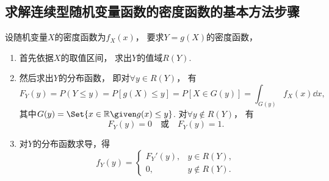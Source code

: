 \subsection{求解连续型随机变量函数的密度函数的基本方法步骤}
设随机变量\(X\)的密度函数为\(f_X(x)\)，
要求\(Y = g(X)\)的密度函数，
\begin{enumerate}
	\item 首先依据\(X\)的取值区间，
	求出\(Y\)的值域\(R(Y)\).

	\item 然后求出\(Y\)的分布函数，
	即对\(\forall y \in R(Y)\)，
	有\begin{equation*}
		F_Y(y) = P(Y \leq y)
		= P[g(X) \leq y]
		= P[X \in G(y)]
		= \int_{G(y)} f_X(x) \dd{x},
	\end{equation*}
	其中\(G(y) = \Set{ x\in\mathbb{R} \given g(x) \leq y }\).
	对\(\forall y \notin R(Y)\)，
	有\begin{equation*}
		F_Y(y) = 0
		\quad\text{或}\quad
		F_Y(y) = 1.
	\end{equation*}

	\item 对\(Y\)的分布函数求导，得\begin{equation*}
		f_Y(y) = \left\{ \begin{array}{cl}
			F_Y'(y), & y \in R(Y), \\
			0, & y \notin R(Y).
		\end{array} \right.
	\end{equation*}
\end{enumerate}
